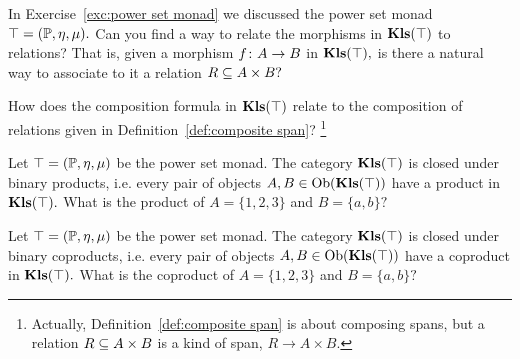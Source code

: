 \documentclass[../main/CT4S-EN-RU]{subfiles}
\begin{document}
\begin{exampleRUS}\label{ex:experimenter matters 3}
\end{exampleRUS}

\begin{exerciseENG}\label{exc:kleisli powerset relations}
In Exercise~\ref{exc:power set monad} we discussed the power set monad $\top=(\PP,\eta,\mu).$
\sexc Can you find a way to relate the morphisms in $\Kls(\top)$ to relations? That is, given a morphism $f\taking A\to B$ in $\Kls(\top),$ is there a natural way to associate to it a relation $R\ss A\times B?$
\item How does the composition formula in $\Kls(\top)$ relate to the composition of relations given in Definition~\ref{def:composite span}?
\footnote{Actually, Definition~\ref{def:composite span} is about composing spans, but a relation $R\ss A\times B$ is a kind of span, $R\to A\times B.$}
\endsexc
\end{exerciseENG}

\begin{exerciseRUS}\label{exc:kleisli powerset relations}
\end{exerciseRUS}

\begin{exerciseENG}
Let $\top=(\PP,\eta,\mu)$ be the power set monad. The category $\Kls(\top)$ is closed under binary products, i.e. every pair of objects $A,B\in\Ob(\Kls(\top))$ have a product in $\Kls(\top).$ What is the product of $A=\{1,2,3\}$ and $B=\{a,b\}?$
\end{exerciseENG}

\begin{exerciseRUS}
\end{exerciseRUS}

\begin{exerciseENG}
Let $\top=(\PP,\eta,\mu)$ be the power set monad. The category $\Kls(\top)$ is closed under binary coproducts, i.e. every pair of objects $A,B\in\Ob(\Kls(\top))$ have a coproduct in $\Kls(\top).$ What is the coproduct of $A=\{1,2,3\}$ and $B=\{a,b\}?$
\end{exerciseENG}

\begin{exerciseRUS}
\end{exerciseRUS}
\end{document}
